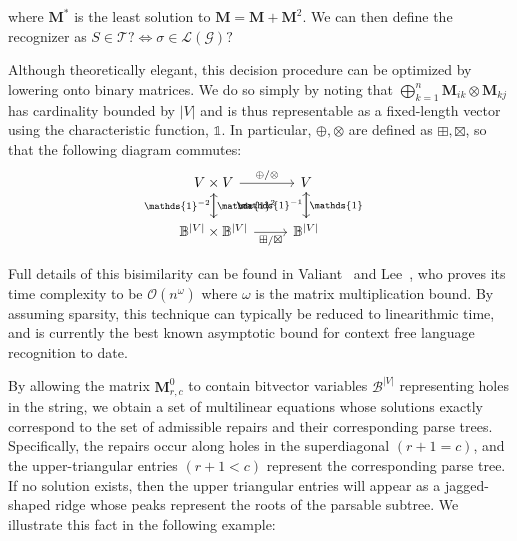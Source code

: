 \documentclass[sigplan,nonacm]{acmart}\settopmatter{printfolios=false,printccs=false,printacmref=false}
\begin{document}
\noindent where $\mathbf{M}^*$ is the least solution to $\mathbf{M} = \mathbf{M} + \mathbf{M}^2$. We can then define the recognizer as $S \in \mathcal{T}? \iff \sigma \in \mathcal{L}(\mathcal{G})?$ %

Although theoretically elegant, this decision procedure can be optimized by lowering onto binary matrices. We do so simply by noting that $\bigoplus_{k = 1}^n \mathbf{M}_{ik} \otimes \mathbf{M}_{kj}$ has cardinality bounded by $|V|$ and is thus representable as a fixed-length vector using the characteristic function, $\mathds{1}$. In particular, $\oplus, \otimes$ are defined as $\boxplus, \boxtimes$, so that the following diagram commutes:
\[\begin{tikzcd}
      V \times V \arrow[r, "\oplus/\otimes"] \arrow[d, "\mathds{1}^2"]
      & V \arrow[d, "\mathds{1}\phantom{^{-1}}"] \\
      \mathbb{B}^{|V|} \times \mathbb{B}^{|V|} \arrow[r, "\boxplus/\boxtimes", labels=below] \arrow[u, "\mathds{1}^{-2}"]
      & \mathbb{B}^{|V|} \arrow[u, "\mathds{1}^{-1}"]
\end{tikzcd}\]

Full details of this bisimilarity can be found in Valiant~\cite{valiant1975general} and Lee~\cite{lee2002fast}, who proves its time complexity to be $\mathcal{O}(n^\omega)$ where $\omega$ is the matrix multiplication bound. By assuming sparsity, this technique can typically be reduced to linearithmic time, and is currently the best known asymptotic bound for context free language recognition to date.

By allowing the matrix $\mathbf{M}^0_{r, c}$ to contain bitvector variables $\mathcal{B}^{|V|}$ representing holes in the string, we obtain a set of multilinear equations whose solutions exactly correspond to the set of admissible repairs and their corresponding parse trees. Specifically, the repairs occur along holes in the superdiagonal $(r+1 = c)$, and the upper-triangular entries $(r + 1 < c)$ represent the corresponding parse tree. If no solution exists, then the upper triangular entries will appear as a jagged-shaped ridge whose peaks represent the roots of the parsable subtree. We illustrate this fact in the following example:
\end{document}
